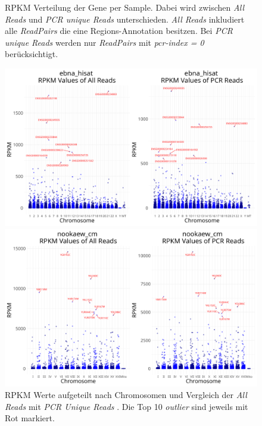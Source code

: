 \documentclass[12pt]{article}
\begin{document}
\begin{figure}[htpb]
\begin{minipage}[t]{0.32\textwidth}
    \end{minipage}
    \caption{RPKM Verteilung der Gene per Sample. Dabei wird zwischen \textit{All Reads} und \textit{PCR unique Reads} unterschieden.
    \textit{All Reads} inkludiert alle \textit{ReadPairs} die eine Regions-Annotation besitzen. Bei \textit{PCR unique Reads} 
    werden nur \textit{ReadPairs} mit \textit{pcr-index = 0} berücksichtigt.}
    \label{fig:density}
\end{figure}

\begin{figure}[htpb]
    \centering
    \begin{minipage}{0.49\textwidth}
        \centering
        \includegraphics[width=\textwidth]{./plots/ebna_hisat/Plots/rpkm_mplot.png}
    \end{minipage}
    \hfill
    \begin{minipage}{0.49\textwidth}
        \centering
        \includegraphics[width=\textwidth]{./plots/nookaew_cm/Plots/rpkm_mplot.png}
    \end{minipage}
    \caption{RPKM Werte aufgeteilt nach Chromosomen und Vergleich der \textit{All Reads} mit \textit{PCR Unique Reads} . Die Top 10 \textit{outlier} sind
    jeweils mit Rot markiert.}
    \label{fig:scatter-small}
\end{figure}
\end{document}
